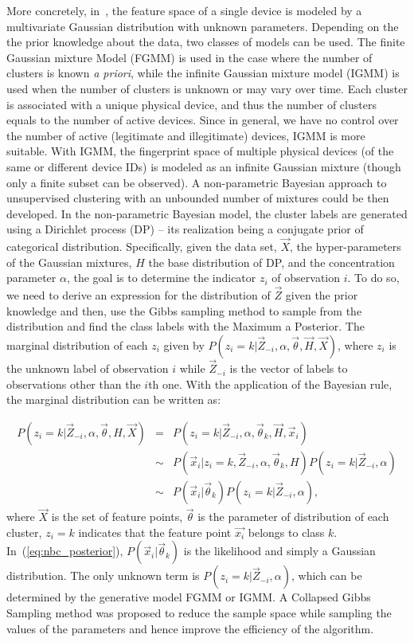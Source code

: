\documentclass[journal,draftcls,onecolumn,11pt]{IEEEtran}
\begin{document}
More concretely, in~\cite{Nguyen2011}, the feature space of a single device is modeled by a multivariate Gaussian distribution with unknown parameters. Depending on the the prior knowledge about the data, two classes of models can be used. The finite Gaussian mixture Model (FGMM) is used in the case where the number of clusters is known {\it a priori}, while the infinite Gaussian mixture model (IGMM) is used when the number of clusters is unknown or may vary over time. Each cluster is associated with a unique physical device, and thus the number of clusters equals to the number of active devices. Since in general, we have no control over the number of active (legitimate and illegitimate) devices, IGMM is more suitable. With IGMM, the fingerprint space of multiple physical devices (of the same or different device IDs) is modeled as an infinite Gaussian mixture (though only a finite subset can be observed). A non-parametric Bayesian approach to unsupervised clustering with an unbounded number of mixtures could be then developed. In the non-parametric Bayesian model, the cluster labels are generated using a Dirichlet process (DP) -- its realization being a conjugate prior of categorical distribution. Specifically, given the data set, $\vec{X}$, the hyper-parameters of the Gaussian mixtures, $H$ the base distribution of DP, and the concentration parameter $\alpha$, the goal is to determine the indicator $z_i$ of observation $i$. To do so, we need to derive an expression for the distribution of $\vec{Z}$ given the prior knowledge and then, use the Gibbs sampling method to sample from the distribution and find the class labels with the Maximum a Posterior.  The marginal distribution of each $z_i$ given by $P(z_i=k|\vec{Z}_{-i},\alpha,\vec{\theta},\vec{H},\vec{X})$, where $z_i$ is the unknown label of observation $i$ while $\vec{Z}_{-i}$ is the vector of labels to observations other than the $i$th one. With the application of the Bayesian rule, the marginal distribution can be written as:

\begin{equation}
\begin{array}{lll}
    P(z_i=k|\vec{Z}_{-i},\alpha,\vec{\theta},H,\vec{X}) & = & P(z_i=k|\vec{Z}_{-i},\alpha,\vec{\theta}_k,\vec{H},\vec{x}_i)  \\
    & \sim & P(\vec{x}_i|z_i = k, \vec{Z}_{-i}, \alpha, \vec{\theta}_k, H)P(z_i = k|\vec{Z}_{-i}, \alpha) \\
    & \sim & P(\vec{x}_i|\vec{\theta}_k)P(z_i = k|\vec{Z}_{-i}, \alpha),
\end{array}
\label{eq:nbc_posterior}
\end{equation}
where $\vec{X}$ is the set of feature points, $\vec{\theta}$ is the parameter of distribution of each cluster, $z_i = k$ indicates that the feature point $\vec{x_i}$ belongs to class $k$. In~(\ref{eq:nbc_posterior}), $P(\vec{x}_i|\vec{\theta}_k)$ is the likelihood and simply a Gaussian distribution. The only unknown term is $P(z_i = k|\vec{Z}_{-i}, \alpha)$, which can be determined by the generative model FGMM or IGMM. A Collapsed Gibbs Sampling method was proposed to reduce the sample space while sampling the values of the parameters and hence improve the efficiency of the algorithm.
\end{document}
